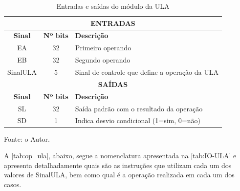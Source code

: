 \documentclass[
	12pt,				%
	oneside,
	a4paper,			%
	english,			%
	french,				%
	spanish,			%
	brazil,				%
	]{abntex2}
\begin{document}
\setlength{\tabcolsep}{10pt}
\begin{table}[H]
\centering
\caption{Entradas e saídas do módulo da ULA}
\label{tab:IO-ULA}
\begin{tabular}{|c|c|l|}
\hline
\multicolumn{3}{|c|}{\textbf{ENTRADAS}} \\
\hline
\textbf{Sinal} & \textbf{Nº bits} & \textbf{Descrição} \\
\hline
EA & 32 & Primeiro operando \\
\hline
EB & 32 & Segundo operando \\
\hline
SinalULA & 5 & Sinal de controle que define a operação da ULA \\
\hline
\multicolumn{3}{|c|}{\textbf{SAÍDAS}} \\
\hline
\textbf{Sinal} & \textbf{Nº bits} & \textbf{Descrição} \\
\hline
SL & 32 & Saída padrão com o resultado da operação \\
\hline
SD & 1 & Indica desvio condicional (1=sim, 0=não) \\
\hline
\end{tabular}
\vspace{-0.5em}
\begin{center}
Fonte: o Autor.
\end{center}
\end{table}

A \autoref{tab:op_ula}, abaixo, segue a nomenclatura apresentada na \autoref{tab:IO-ULA} e apresenta detalhadamente quais são as instruções que utilizam cada um dos valores de SinalULA, bem como qual é a operação realizada em cada um dos casos.
\end{document}
